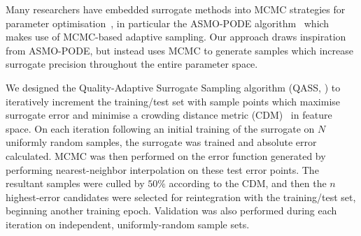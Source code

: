 Many researchers have embedded surrogate methods into MCMC strategies for
parameter optimisation~\cite{Zhang2020,Gong2017}, in particular the ASMO-PODE
algorithm~\cite{Ginting2011} which makes use of MCMC-based adaptive sampling. Our approach draws inspiration from ASMO-PODE, but instead uses MCMC to generate samples
which increase surrogate precision throughout the entire parameter space.

We designed the Quality-Adaptive Surrogate Sampling algorithm (QASS, ) to iteratively increment the training/test set with sample
points which maximise surrogate error and minimise a crowding distance metric
(CDM)~\cite{Solonen2012} in feature space. On each iteration following an initial training of the surrogate on $N$ uniformly random samples, the surrogate was trained and absolute error calculated. MCMC was then performed on the error function generated by performing nearest-neighbor interpolation on these test error points. The resultant samples were culled by $50\%$ according to the CDM, and then the $n$ highest-error candidates were selected for reintegration with the training/test set, beginning another training epoch. Validation was also performed during each iteration on independent, uniformly-random sample sets.
